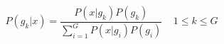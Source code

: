 \begin{equation}
P(g_{k}|x) = \frac{P(x|g_{k}) P(g_{k})} {\sum_{i=1}^{G}P(x|g_{i}) P(g_{i})} \:\:\:\:\: 1\leq k \leq G
\label{eq:grt:gauss}
\end{equation}